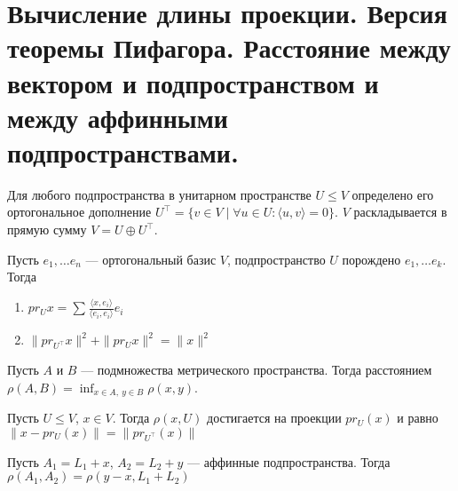 \section{Вычисление длины проекции. Версия теоремы Пифагора. Расстояние между вектором и подпространством и между аффинными подпространствами.}
\begin{note}
    Для любого подпространства в унитарном пространстве $ U \le V$ определено его ортогональное дополнение $ U^{\top} = \{v \in V \mid \forall  u \in U\colon \langle u, v \rangle = 0 \}$. $ V$ раскладывается в прямую сумму  $ V = U \oplus U^{\top}$.
\end{note}
\begin{cor}
    Пусть $ e_1, \ldots e_n $ --- ортогональный базис $ V$,  подпространство  $ U $ порождено  $ e_1, \ldots e_k$. Тогда 
    \begin{enumerate}[noitemsep]
	\item $ pr_U x = \sum_{}^{} \frac{\langle x, e_i \rangle}{\langle e_i, e_i \rangle}e_i$ 
	\item $ \| pr_{U^{\top}}x \|^2 + \| pr_U x \| ^2 = \| x \| ^2 $
    \end{enumerate} 
\end{cor}
\begin{defn}[Расстояние]
    Пусть $ A$ и  $ B$ --- подмножества метрического пространства. Тогда {\sf расстоянием} $ \rho(A, B) = \inf_{x \in A,~ y \in B} \rho(x, y)$.  
\end{defn}
\begin{thm}
    Пусть $ U \le V$, $ x \in V$. Тогда $ \rho(x, U) $ достигается на проекции  $ pr_U(x)$ и равно  $ \| x - pr_U(x) \| = \| pr_{U^{\top}}(x) \|  $
\end{thm}
\begin{lm}
    Пусть $ A_1 = L_1+x$, $ A_2 = L_2+y$ --- аффинные подпространства. Тогда $ \rho(A_1, A_2) = \rho(y-x, L_1+L_2)$
\end{lm}
